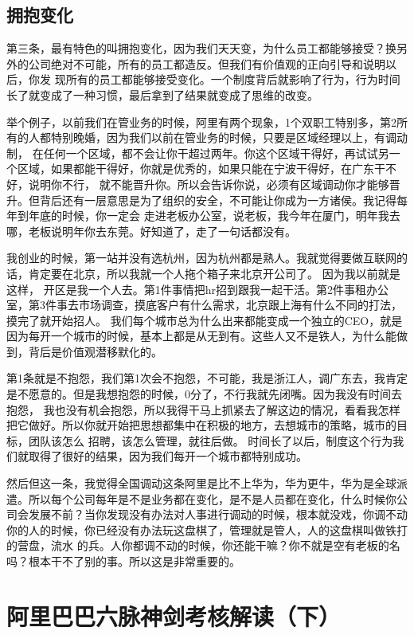 \documentclass[12pt]{article}
\begin{document}
\subsection{拥抱变化}
第三条，最有特色的叫拥抱变化，因为我们天天变，为什么员工都能够接受？换另外的公司绝对不可能，所有的员工都造反。但我们有价值观的正向引导和说明以后，你发 现所有的员工都能够接受变化。一个制度背后就影响了行为，行为时间长了就变成了一种习惯，最后拿到了结果就变成了思维的改变。

举个例子，以前我们在管业务的时候，阿里有两个现象，1个双职工特别多，第2所有的人都特别晚婚，因为我们以前在管业务的时候，只要是区域经理以上，有调动制， 在任何一个区域，都不会让你干超过两年。你这个区域干得好，再试试另一个区域，如果都能干得好，你就是优秀的，如果只能在宁波干得好，在广东干不好，说明你不行， 就不能晋升你。所以会告诉你说，必须有区域调动你才能够晋升。但背后还有一层意思是为了组织的安全，不可能让你成为一方诸侯。我记得每年到年底的时候，你一定会 走进老板办公室，说老板，我今年在厦门，明年我去哪，老板说明年你去东莞。好知道了，走了一句话都没有。

我创业的时候，第一站并没有选杭州，因为杭州都是熟人。我就觉得要做互联网的话，肯定要在北京，所以我就一个人拖个箱子来北京开公司了。 因为我以前就是这样， 开区是我一个人去。第1件事情把hr招到跟我一起干活。第2件事租办公室，第3件事去市场调查，摸底客户有什么需求，北京跟上海有什么不同的打法，摸完了就开始招人。 我们每个城市总为什么出来都能变成一个独立的CEO，就是因为每开一个城市的时候，基本上都是从无到有。这些人又不是铁人，为什么能做到，背后是价值观潜移默化的。

第1条就是不抱怨，我们第1次会不抱怨，不可能，我是浙江人，调广东去，我肯定是不愿意的。但是我想抱怨的时候，0分了，不行我就先闭嘴。因为我没有时间去抱怨， 我也没有机会抱怨，所以我得干马上抓紧去了解这边的情况，看看我怎样把它做好。所以你就开始把思想都集中在积极的地方，去想城市的策略，城市的目标，团队该怎么 招聘，该怎么管理，就往后做。 时间长了以后，制度这个行为我们就取得了很好的结果，因为我们每开一个城市都特别成功。

然后但这一条，我觉得全国调动这条阿里是比不上华为，华为更牛，华为是全球派遣。所以每个公司每年是不是业务都在变化，是不是人员都在变化，什么时候你公司会发展不前？当你发现没有办法对人事进行调动的时候，根本就没戏，你调不动你的人的时候，你已经没有办法玩这盘棋了，管理就是管人，人的这盘棋叫做铁打的营盘，流水 的兵。人你都调不动的时候，你还能干嘛？你不就是空有老板的名吗？根本干不了别的事。所以这是非常重要的。

\section{阿里巴巴六脉神剑考核解读（下）}
\end{document}
